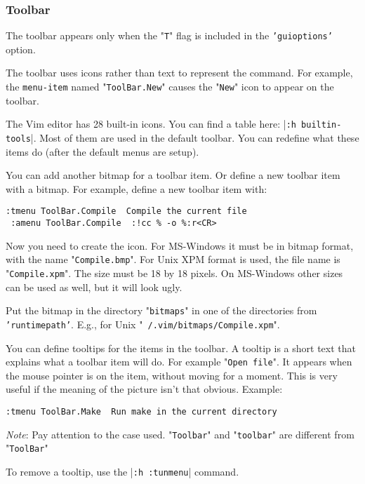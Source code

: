 \subsubsection{Toolbar}
The toolbar appears only when the "\texttt{T}" flag is included in the \texttt{'guioptions'} option.

The toolbar uses icons rather than text to represent the command.
For example, the \texttt{{menu-item}} named "\texttt{ToolBar.New}" causes the "\texttt{New}" icon to appear on the toolbar.

The Vim editor has 28 built-in icons.
You can find a table here: |\texttt{:h builtin-tools}|.
Most of them are used in the default toolbar.
You can redefine what these items do (after the default menus are setup).

You can add another bitmap for a toolbar item.
Or define a new toolbar item with a bitmap.
For example, define a new toolbar item with:

\begin{Verbatim}[samepage=true]
 :tmenu ToolBar.Compile  Compile the current file
 :amenu ToolBar.Compile  :!cc % -o %:r<CR>
\end{Verbatim}

Now you need to create the icon.
For MS-Windows it must be in bitmap format, with the name "\texttt{Compile.bmp}".
For Unix XPM format is used, the file name is "\texttt{Compile.xpm}".
The size must be 18 by 18 pixels.
On MS-Windows other sizes can be used as well, but it will look ugly.

Put the bitmap in the directory "\texttt{bitmaps}" in one of the directories from \texttt{'runtimepath'}.
E.g., for Unix "\texttt{~/.vim/bitmaps/Compile.xpm}".

You can define tooltips for the items in the toolbar.
A tooltip is a short text that explains what a toolbar item will do.
For example "\texttt{Open file}".
It appears when the mouse pointer is on the item, without moving for a moment.
This is very useful if the meaning of the picture isn't that obvious.
Example:

\begin{Verbatim}[samepage=true]
 :tmenu ToolBar.Make  Run make in the current directory
\end{Verbatim}
 
\emph{Note}: Pay attention to the case used.
"\texttt{Toolbar}" and "\texttt{toolbar}" are different from "\texttt{ToolBar}"

To remove a tooltip, use the |\texttt{:h :tunmenu}| command.

